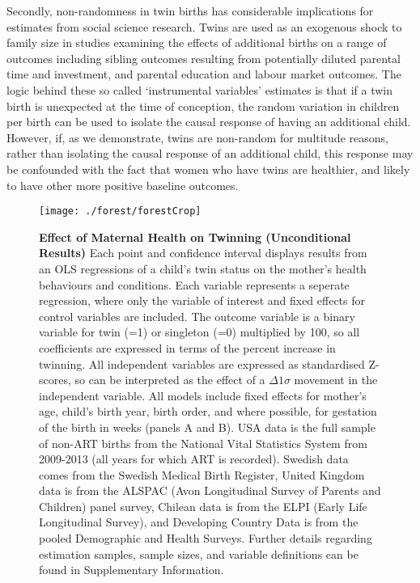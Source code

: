 \documentclass{nature}
\begin{document}
\begin{linenumbers}
Secondly, non-randomness in twin births has considerable implications for estimates from social science research.  Twins are used as an exogenous shock to family size in studies examining the effects of additional births on a range of outcomes including sibling outcomes resulting from potentially diluted parental time and investment, and parental education and labour market outcomes.  The logic behind these so called `instrumental variables' estimates is that if a twin birth is unexpected at the time of conception, the random variation in children per birth can be used to isolate the causal response of having an additional child.  However, if, as we demonstrate, twins are non-random for multitude reasons, rather than isolating the causal response of an additional child, this response may be confounded with the fact that women who have twins are healthier, and likely to have other more positive baseline outcomes.


\clearpage
%

\thispagestyle{empty}
\begin{spacing}{1}
\begin{figure}
\begin{center}
  \texttt{[image: ./forest/forestCrop]}
\end{center}
\caption{\textbf{Effect of Maternal Health on Twinning (Unconditional Results)} {\footnotesize Each point and confidence interval displays results from an OLS regressions of a child's twin status on the mother's health behaviours and conditions. Each variable represents a seperate regression, where only the variable of interest and fixed effects for control variables are included. The outcome variable is a binary variable for twin (=1) or singleton (=0) multiplied by 100, so all coefficients are expressed in terms of the percent increase in twinning.  All independent variables are expressed as standardised Z-scores, so can be interpreted as the effect of a $\Delta 1\sigma$ movement in the independent variable. All models include fixed effects for mother's age, child's birth year, birth order, and where possible, for gestation of the birth in weeks (panels A and B).  USA data is the full sample of non-ART births from the National Vital Statistics System from 2009-2013 (all years for which ART is recorded).  Swedish data comes from the Swedish Medical Birth Register, United Kingdom data is from the ALSPAC (Avon Longitudinal Survey of Parents and Children) panel survey, Chilean data is from the ELPI (Early Life Longitudinal Survey), and Developing Country Data is from the pooled Demographic and Health Surveys. Further details regarding estimation samples, sample sizes, and variable definitions can be found in Supplementary Information.}}
\label{fig:fullEsts}
\end{figure}



\end{spacing}
\end{linenumbers}
\end{document}

